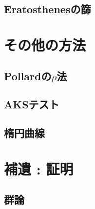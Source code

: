 \subsection{Eratosthenesの篩}


\section{その他の方法}
\subsection{Pollardの$\rho$法}

\subsection{AKSテスト}

\subsection{楕円曲線}


\section{補遺 : 証明}
\subsection{群論}


\newpage
\printindex



